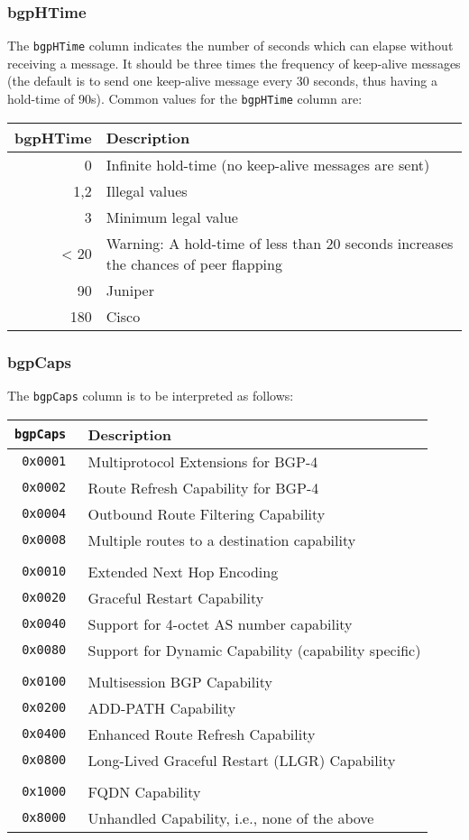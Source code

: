 \documentclass[documentation]{subfiles}
\begin{document}
\subsubsection{bgpHTime}\label{bgpHTime}
The {\tt bgpHTime} column indicates the number of seconds which can elapse without receiving a message.
It should be three times the frequency of keep-alive messages (the default is to send one keep-alive message every 30 seconds, thus having a hold-time of 90s).
Common values for the {\tt bgpHTime} column are:\\
\begin{longtable}{rl}
    \toprule
    {\bf bgpHTime} & {\bf Description}\\
    \midrule\endhead%
    0    & Infinite hold-time (no keep-alive messages are sent)\\
    1,2  & Illegal values\\
    3    & Minimum legal value\\
    < 20 & Warning: A hold-time of less than 20 seconds increases the chances of peer flapping\\
    90   & Juniper\\
    180  & Cisco\\
    \bottomrule
\end{longtable}

\subsubsection{bgpCaps}\label{bgpCaps}
The {\tt bgpCaps} column is to be interpreted as follows:\\
\begin{longtable}{>{\tt}rl}
    \toprule
    {\bf bgpCaps} & {\bf Description}\\
    \midrule\endhead%
    0x0001 & Multiprotocol Extensions for BGP-4\\
    0x0002 & Route Refresh Capability for BGP-4\\
    0x0004 & Outbound Route Filtering Capability\\
    0x0008 & Multiple routes to a destination capability\\
    \\
    0x0010 & Extended Next Hop Encoding\\
    0x0020 & Graceful Restart Capability\\
    0x0040 & Support for 4-octet AS number capability\\
    0x0080 & Support for Dynamic Capability (capability specific)\\
    \\
    0x0100 & Multisession BGP Capability\\
    0x0200 & ADD-PATH Capability\\
    0x0400 & Enhanced Route Refresh Capability\\
    0x0800 & Long-Lived Graceful Restart (LLGR) Capability\\
    \\
    0x1000 & FQDN Capability\\
    0x8000 & Unhandled Capability, i.e., none of the above\\
    \bottomrule
\end{longtable}
\end{document}
